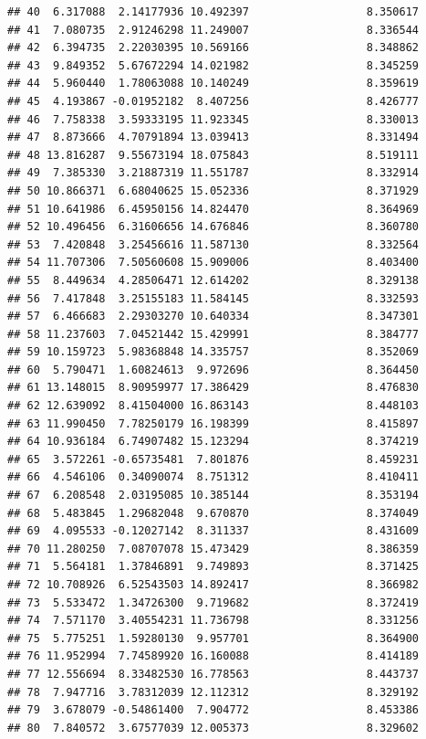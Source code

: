 \documentclass[
]{book}
\begin{document}
\begin{verbatim}
## 40  6.317088  2.14177936 10.492397                  8.350617
## 41  7.080735  2.91246298 11.249007                  8.336544
## 42  6.394735  2.22030395 10.569166                  8.348862
## 43  9.849352  5.67672294 14.021982                  8.345259
## 44  5.960440  1.78063088 10.140249                  8.359619
## 45  4.193867 -0.01952182  8.407256                  8.426777
## 46  7.758338  3.59333195 11.923345                  8.330013
## 47  8.873666  4.70791894 13.039413                  8.331494
## 48 13.816287  9.55673194 18.075843                  8.519111
## 49  7.385330  3.21887319 11.551787                  8.332914
## 50 10.866371  6.68040625 15.052336                  8.371929
## 51 10.641986  6.45950156 14.824470                  8.364969
## 52 10.496456  6.31606656 14.676846                  8.360780
## 53  7.420848  3.25456616 11.587130                  8.332564
## 54 11.707306  7.50560608 15.909006                  8.403400
## 55  8.449634  4.28506471 12.614202                  8.329138
## 56  7.417848  3.25155183 11.584145                  8.332593
## 57  6.466683  2.29303270 10.640334                  8.347301
## 58 11.237603  7.04521442 15.429991                  8.384777
## 59 10.159723  5.98368848 14.335757                  8.352069
## 60  5.790471  1.60824613  9.972696                  8.364450
## 61 13.148015  8.90959977 17.386429                  8.476830
## 62 12.639092  8.41504000 16.863143                  8.448103
## 63 11.990450  7.78250179 16.198399                  8.415897
## 64 10.936184  6.74907482 15.123294                  8.374219
## 65  3.572261 -0.65735481  7.801876                  8.459231
## 66  4.546106  0.34090074  8.751312                  8.410411
## 67  6.208548  2.03195085 10.385144                  8.353194
## 68  5.483845  1.29682048  9.670870                  8.374049
## 69  4.095533 -0.12027142  8.311337                  8.431609
## 70 11.280250  7.08707078 15.473429                  8.386359
## 71  5.564181  1.37846891  9.749893                  8.371425
## 72 10.708926  6.52543503 14.892417                  8.366982
## 73  5.533472  1.34726300  9.719682                  8.372419
## 74  7.571170  3.40554231 11.736798                  8.331256
## 75  5.775251  1.59280130  9.957701                  8.364900
## 76 11.952994  7.74589920 16.160088                  8.414189
## 77 12.556694  8.33482530 16.778563                  8.443737
## 78  7.947716  3.78312039 12.112312                  8.329192
## 79  3.678079 -0.54861400  7.904772                  8.453386
## 80  7.840572  3.67577039 12.005373                  8.329602

\end{verbatim}
\end{document}
